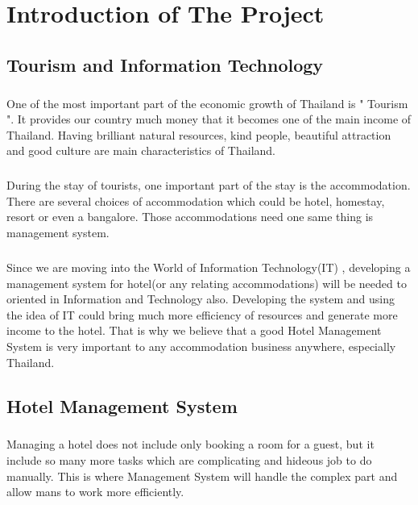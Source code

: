 
\chapter{Introduction of The Project}
\section{Tourism and Information Technology}
\paragraph{}
One of the most important part of the economic growth of Thailand is " Tourism ". It provides our country much money that it becomes one of the main income of Thailand. Having brilliant natural resources, kind people, beautiful attraction and good culture are main characteristics of Thailand.
\paragraph{}
    During the stay of tourists, one important part of the stay is the accommodation. There are several choices of accommodation which could be hotel, homestay, resort or even a bangalore. Those accommodations need one same thing is management system.
 \paragraph{}
    Since we are moving into the World of Information Technology(IT) , developing a management system for hotel(or any relating accommodations) will be needed to oriented in Information and Technology also. Developing the system and using the idea of IT could bring much more efficiency of resources and generate more income to the hotel. That is why we believe that a good Hotel Management System is very important to any accommodation business anywhere, especially Thailand.

\section{Hotel Management System}
\paragraph{}
Managing a hotel does not include only booking a room for a guest, but it include so many more tasks which are complicating and hideous job to do manually. This is where Management System will handle the complex part and allow mans to work more efficiently.

